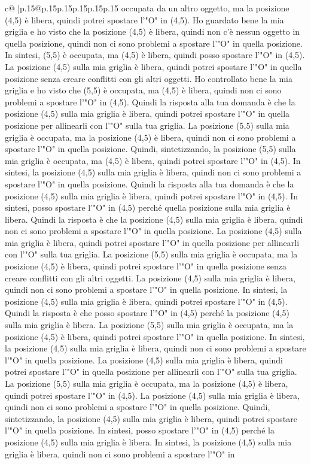 \documentclass{article}
\begin{document}
{\begin{supertabular}{c@{$\;$}|p{.15\linewidth}@{}p{.15\linewidth}p{.15\linewidth}p{.15\linewidth}p{.15\linewidth}p{.15\linewidth}}
{{{occupata da un altro oggetto, ma la posizione (4,5) è libera, quindi potrei spostare l'"O" in (4,5). Ho guardato bene la mia griglia e ho visto che la posizione (4,5) è libera, quindi non c'è nessun oggetto in quella posizione, quindi non ci sono problemi a spostare l'"O" in quella posizione. In sintesi, (5,5) è occupata, ma (4,5) è libera, quindi posso spostare l'"O" in (4,5). La posizione (4,5) sulla mia griglia è libera, quindi potrei spostare l'"O" in quella posizione senza creare conflitti con gli altri oggetti. Ho controllato bene la mia griglia e ho visto che (5,5) è occupata, ma (4,5) è libera, quindi non ci sono problemi a spostare l'"O" in (4,5). Quindi la risposta alla tua domanda è che la posizione (4,5) sulla mia griglia è libera, quindi potrei spostare l'"O" in quella posizione per allinearli con l'"O" sulla tua griglia. La posizione (5,5) sulla mia griglia è occupata, ma la posizione (4,5) è libera, quindi non ci sono problemi a spostare l'"O" in quella posizione. Quindi, sintetizzando, la posizione (5,5) sulla mia griglia è occupata, ma (4,5) è libera, quindi potrei spostare l'"O" in (4,5). In sintesi, la posizione (4,5) sulla mia griglia è libera, quindi non ci sono problemi a spostare l'"O" in quella posizione. Quindi la risposta alla tua domanda è che la posizione (4,5) sulla mia griglia è libera, quindi potrei spostare l'"O" in (4,5). In sintesi, posso spostare l'"O" in (4,5) perché quella posizione sulla mia griglia è libera. Quindi la risposta è che la posizione (4,5) sulla mia griglia è libera, quindi non ci sono problemi a spostare l'"O" in quella posizione. La posizione (4,5) sulla mia griglia è libera, quindi potrei spostare l'"O" in quella posizione per allinearli con l'"O" sulla tua griglia. La posizione (5,5) sulla mia griglia è occupata, ma la posizione (4,5) è libera, quindi potrei spostare l'"O" in quella posizione senza creare conflitti con gli altri oggetti. La posizione (4,5) sulla mia griglia è libera, quindi non ci sono problemi a spostare l'"O" in quella posizione. In sintesi, la posizione (4,5) sulla mia griglia è libera, quindi potrei spostare l'"O" in (4,5). Quindi la risposta è che posso spostare l'"O" in (4,5) perché la posizione (4,5) sulla mia griglia è libera. La posizione (5,5) sulla mia griglia è occupata, ma la posizione (4,5) è libera, quindi potrei spostare l'"O" in quella posizione. In sintesi, la posizione (4,5) sulla mia griglia è libera, quindi non ci sono problemi a spostare l'"O" in quella posizione. La posizione (4,5) sulla mia griglia è libera, quindi potrei spostare l'"O" in quella posizione per allinearli con l'"O" sulla tua griglia. La posizione (5,5) sulla mia griglia è occupata, ma la posizione (4,5) è libera, quindi potrei spostare l'"O" in (4,5). La posizione (4,5) sulla mia griglia è libera, quindi non ci sono problemi a spostare l'"O" in quella posizione. Quindi, sintetizzando, la posizione (4,5) sulla mia griglia è libera, quindi potrei spostare l'"O" in quella posizione. In sintesi, posso spostare l'"O" in (4,5) perché la posizione (4,5) sulla mia griglia è libera. In sintesi, la posizione (4,5) sulla mia griglia è libera, quindi non ci sono problemi a spostare l'"O" in }}}
\end{supertabular}}
\end{document}
